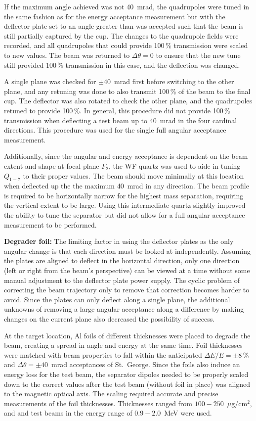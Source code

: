 If the maximum angle achieved was not 40~mrad, the quadrupoles were tuned in
the same fashion as for the energy acceptance measurement but with the
deflector plate set to an angle greater than was accepted such that the beam
is still partially captured by the cup. The changes to the quadrupole fields
were recorded, and all quadrupoles that could provide 100\,\% transmission were
scaled to new values. The beam was returned to $\Delta\theta = 0$ to ensure
that the new tune still provided 100\,\% transmission in this case, and the
deflection was changed.

A single plane was checked for $\pm 40$~mrad first before switching to the
other plane, and any retuning was done to also transmit 100\,\% of the beam to
the final cup. The deflector was also rotated to check the other plane, and
the quadrupoles retuned to provide 100\,\%. In general, this procedure did not
provide 100\,\% transmission when deflecting a test beam up to 40~mrad in the
four cardinal directions. This procedure was used for the single full angular
acceptance measurement.

Additionally, since the angular and energy acceptance is dependent on the
beam extent and shape at focal plane $F_2$, the WF quartz was used to
aide in tuning $Q_{1-7}$ to their proper values. The beam should move minimally
at this location when deflected up the the maximum 40~mrad in any direction.
The beam profile is required to be horizontally narrow for the highest mass
separation, requiring the vertical extent to be large. Using this intermediate
quartz slightly improved the ability to tune the separator but did not allow
for a full angular acceptance measurement to be performed.

\textbf{Degrader foil:}
The limiting factor in using the deflector plates as the only angular change is
that each direction must be looked at independently. Assuming the plates are
aligned to deflect in the horizontal direction, only one direction (left or
right from the beam's perspective) can be viewed at a time without some
manual adjustment to the deflector plate power supply. The cyclic problem of
correcting the beam trajectory only to remove that correction becomes harder to
avoid. Since the plates can only deflect along a single plane, the additional
unknowns of removing a large angular acceptance along a difference by making
changes on the current plane also decreased the possibility of success.

At the target location, Al foils of different thicknesses were placed to
degrade the beam, creating a spread in angle and energy at the same time. Foil
thicknesses were matched with beam properties to fall within the anticipated
$\Delta E/E = \pm 8$\,\% and $\Delta\theta = \pm 40$~mrad acceptances of St.\
George. Since the foils also induce an energy loss for the test beam, the
separator dipoles needed to be properly scaled down to the correct values after
the test beam (without foil in place) was aligned to the magnetic optical axis.
The scaling required accurate and precise measurements of the foil thicknesses.
Thicknesses ranged from $100-250$~$\mu$g/cm$^2$, and \nuc{1}{H} and \nuc{4}{He}
test beams in the energy range of $0.9-2.0$~MeV were used.

